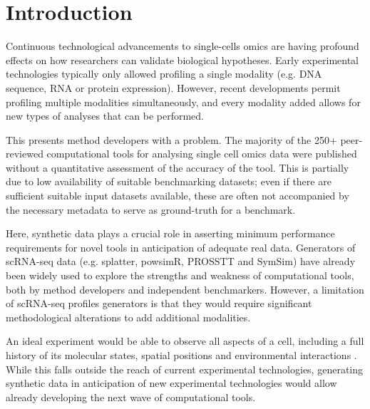 

\section{Introduction}
Continuous technological advancements to single-cells omics are having profound 
effects on how researchers can validate biological hypotheses. 
Early experimental technologies typically only allowed profiling a single modality (e.g. DNA sequence, 
RNA or protein expression). However, recent developments permit profiling multiple modalities simultaneously,
and every modality added allows for new types of analyses that can be performed.

This presents method developers with a problem. The majority of the 250+ peer-reviewed computational tools for analysing single cell omics data were published without a quantitative assessment of the accuracy of the tool. This is partially due to low availability of suitable benchmarking datasets; even if there are sufficient suitable input datasets available, these are often not accompanied by the necessary metadata to serve as ground-truth for a benchmark.

Here, synthetic data plays a crucial role in asserting minimum performance requirements for novel tools in anticipation of adequate real data. Generators of scRNA-seq data (e.g. splatter\cite{zappia_splattersimulationsinglecell_2017}, powsimR\cite{vieth_powsimrpoweranalysis_2017}, PROSSTT\cite{papadopoulos_prossttprobabilisticsimulation_2018} and SymSim\cite{zhang_simulatingmultiplefaceted_2019}) have already been widely used to explore the strengths and weakness of computational tools, both by method developers\cite{street_slingshotcelllineage_2018,parra_reconstructingcomplexlineage_2018,lummertzdarocha_reconstructioncomplexsinglecell_2018,lin_scclassifyhierarchicalclassification_2019} and independent benchmarkers\cite{duo_systematicperformanceevaluation_2018,saelens_comparisonsinglecelltrajectory_2019,soneson_biasrobustnessscalability_2018}.
However, a limitation of scRNA-seq profiles generators is that they would require significant methodological alterations to add additional modalities.

An ideal experiment would be able to observe all aspects of a cell, including a full history of its 
molecular states, spatial positions and environmental interactions \cite{stuart_integrativesinglecellanalysis_2019}.
While this falls outside the reach of current experimental technologies, generating synthetic data in anticipation of new experimental technologies would allow already developing the next wave of computational tools.

